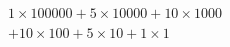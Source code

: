 \documentclass[preview]{standalone}
\begin{document}
\begin{center}
$1\times100000 + 5\times10000 + 10\times1000$\\$+ 10\times100 + 5\times10 + 1\times1$
\end{center}
\end{document}
